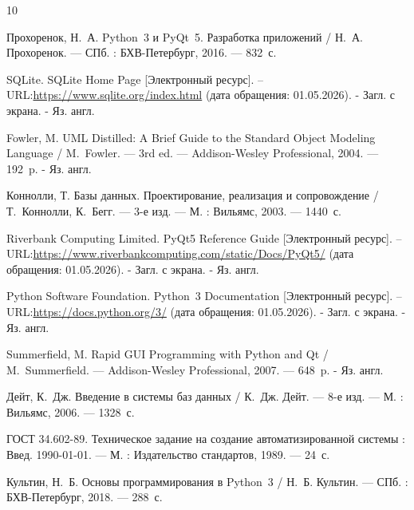 \documentclass[14pt]{extreport}
\begin{document}
	
	\begin{thebibliography}{10}
		
	 Прохоренок, Н.~А. Python~3 и PyQt~5. Разработка приложений / Н.~А. Прохоренок. --- СПб. : БХВ-Петербург, 2016. --- 832~с.
	
	 SQLite. SQLite Home Page [Электронный ресурс]. – URL:\url{https://www.sqlite.org/index.html} (дата обращения: 01.05.2026). - Загл. с экрана. - Яз. англ.
	
	 Fowler, M. UML Distilled: A Brief Guide to the Standard Object Modeling Language / M.~Fowler. --- 3rd ed. --- Addison-Wesley Professional, 2004. --- 192~p. - Яз. англ.
	
	 Коннолли, Т. Базы данных. Проектирование, реализация и сопровождение / Т.~Коннолли, К.~Бегг. --- 3-е изд. --- М. : Вильямс, 2003. --- 1440~с.
	
	 Riverbank Computing Limited. PyQt5 Reference Guide [Электронный ресурс]. – URL:\url{https://www.riverbankcomputing.com/static/Docs/PyQt5/} (дата обращения: 01.05.2026). - Загл. с экрана. - Яз. англ.
	
	 Python Software Foundation. Python~3 Documentation [Электронный ресурс]. – URL:\url{https://docs.python.org/3/} (дата обращения: 01.05.2026). - Загл. с экрана. - Яз. англ.
	
	 Summerfield, M. Rapid GUI Programming with Python and Qt / M.~Summerfield. --- Addison-Wesley Professional, 2007. --- 648~p. - Яз. англ.
	
	 Дейт, К.~Дж. Введение в системы баз данных / К.~Дж. Дейт. --- 8-е изд. --- М. : Вильямс, 2006. --- 1328~с.
	
	 ГОСТ 34.602-89. Техническое задание на создание автоматизированной системы : Введ. 1990-01-01. --- М. : Издательство стандартов, 1989. --- 24~с.
	
	 Культин, Н.~Б. Основы программирования в Python~3 / Н.~Б. Культин. --- СПб. : БХВ-Петербург, 2018. --- 288~с.
	
\end{thebibliography}
\end{document}
